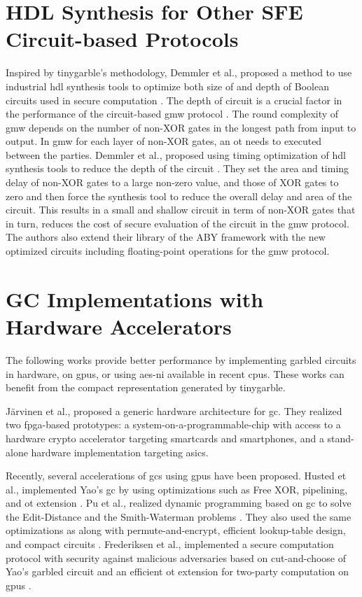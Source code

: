 \section{HDL Synthesis for Other SFE Circuit-based Protocols} \label{sec:related-hdl}
Inspired by \gls{tinygarble}'s methodology, Demmler et al., proposed a method to use industrial \acrshort{hdl} synthesis tools to optimize both size of and depth of Boolean circuits used in secure computation \cite{demmler2015automated}.
The depth of circuit is a crucial factor in the performance of the circuit-based \acrfull{gmw} protocol \cite{goldreich1987play}.
The round complexity of \acrshort{gmw} depends on the number of non-XOR gates in the longest path from input to output.
In \acrshort{gmw} for each layer of non-XOR gates, an \acrshort{ot} needs to executed between the parties.
Demmler et al., proposed using timing optimization of \acrshort{hdl} synthesis tools to reduce the depth of the circuit \cite{demmler2015automated}.
They set the area and timing delay of non-XOR gates to a large non-zero value, and those of XOR gates to zero and then force the synthesis tool to reduce the overall delay and area of the circuit.
This results in a small and shallow circuit in term of non-XOR gates that in turn, reduces the cost of secure evaluation of the circuit in the \acrshort{gmw} protocol.
The authors also extend their library of the ABY framework \cite{demmler2015aby} with the new optimized circuits including floating-point operations for the \acrshort{gmw} protocol.

\section{GC Implementations with Hardware Accelerators} \label{sec:related-hardware}
The following works provide better performance by implementing garbled circuits in hardware, on \acrshort{gpu}s, or using \acrshort{aes-ni} available in recent \acrshort{cpu}s.
These works can benefit from the compact representation generated by \gls{tinygarble}.

J\"arvinen et al., \cite{jarvinen2010garbled} proposed a generic hardware architecture for \acrshort{gc}.
They realized two \acrshort{fpga}-based prototypes: a system-on-a-programmable-chip with access to a hardware crypto accelerator targeting smartcards and smartphones, and a stand-alone hardware implementation targeting \acrshort{asic}s.

Recently, several accelerations of \acrshort{gc}s using \acrshort{gpu}s have been proposed.
Husted et al., implemented Yao's \acrshort{gc} by using optimizations such as Free XOR, pipelining, and \acrshort{ot} extension \cite{husted2013gpu}.
Pu et al., realized dynamic programming based on \acrshort{gc} to solve the Edit-Distance and the Smith-Waterman problems \cite{pu2013computing}.
They also used the same optimizations as \cite{husted2013gpu} along with permute-and-encrypt, efficient lookup-table design, and compact circuits \cite{pu2013computing}.
Frederiksen et al., implemented a secure computation protocol with security against malicious adversaries based on cut-and-choose of Yao's garbled circuit and an efficient \acrshort{ot} extension for two-party computation on \acrshort{gpu}s \cite{frederiksen2013fast}.


